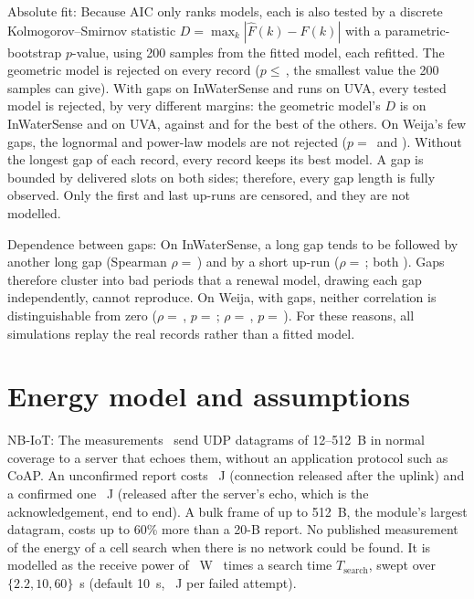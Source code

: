 \documentclass[journal]{IEEEtran}
\begin{document}
Absolute fit: Because AIC only ranks models, each is also tested by a discrete Kolmogorov--Smirnov statistic $D=\max_k|\hat F(k)-F(k)|$ with a parametric-bootstrap $p$-value, using 200 samples from the fitted model, each refitted. The geometric model is rejected on every record ($p\le$\,\gofPmin, the smallest value the 200 samples can give). With \gofInwsN{} gaps on InWaterSense and \gofUvaN{} runs on UVA, every tested model is rejected, by very different margins: the geometric model's $D$ is \gofGeomDInws{} on InWaterSense and \gofGeomDUva{} on UVA, against \gofBestDInws{} and \gofBestDUva{} for the best of the others. On Weija's few gaps, the lognormal and power-law models are not rejected ($p=$\,\gofWeijaLnP{} and \gofWeijaPlP). Without the longest gap of each record, every record keeps its best model. A gap is bounded by delivered slots on both sides; therefore, every gap length is fully observed. Only the first and last up-runs are censored, and they are not modelled.

Dependence between gaps: On InWaterSense, a long gap tends to be followed by another long gap (Spearman $\rho=$\,\inwsRhoNextOut) and by a short up-run ($\rho=$\,\inwsRhoNextUp; both \inwsRhoP). Gaps therefore cluster into bad periods that a renewal model, drawing each gap independently, cannot reproduce. On Weija, with \weijaCondOutages{} gaps, neither correlation is distinguishable from zero ($\rho=$\,\weijaRhoNextOut, $p=$\,\weijaPNextOut; $\rho=$\,\weijaRhoNextUp, $p=$\,\weijaPNextUp). For these reasons, all simulations replay the real records rather than a fitted model.

\section{Energy model and assumptions}
\label{sec:s-energy}
NB-IoT: The measurements~\cite{michelinakis2021dissecting} send UDP datagrams of 12--512~B in normal coverage to a server that echoes them, without an application protocol such as CoAP. An unconfirmed report costs \eNbUnconf~J (connection released after the uplink) and a confirmed one \eNbConf~J (released after the server's echo, which is the acknowledgement, end to end). A bulk frame of up to 512~B, the module's largest datagram, costs up to 60\% more than a 20-B report. No published measurement of the energy of a cell search when there is no network could be found. It is modelled as the receive power of \pRxNb~W~\cite{sorensen2022nbiot} times a search time $T_\mathrm{search}$, swept over $\{2.2, 10, 60\}$~s (default 10~s, \eNbSearch~J per failed attempt).
\end{document}
